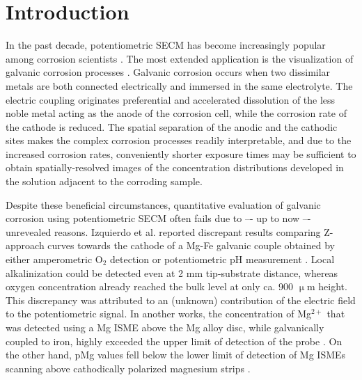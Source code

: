 \documentclass[3p]{elsarticle}
\begin{document}
\section{Introduction}

In the past decade, potentiometric SECM has become increasingly popular among corrosion scientists \cite{lamaka, ZnISME, diamondel, cutedge, H+selective, simulating}.
The most extended application is the visualization of galvanic corrosion processes \cite{amperopot, chloride, spatiozn, fezn}.
Galvanic corrosion occurs when two dissimilar metals are both connected electrically and immersed in the same electrolyte. 
The electric coupling originates preferential and accelerated dissolution of the less noble metal acting as the anode of the corrosion cell, while the corrosion rate of the cathode is reduced.
The spatial separation of the anodic and the cathodic sites makes the complex corrosion processes readily interpretable, and due to the increased corrosion rates, conveniently shorter exposure times may be sufficient to obtain spatially-resolved images of the concentration distributions developed in the solution adjacent to the corroding sample.

Despite these beneficial circumstances, quantitative evaluation of galvanic corrosion using potentiometric SECM often fails due to –- up to now –- unrevealed reasons.
Izquierdo et al. reported discrepant results comparing Z-approach curves towards the cathode of a Mg-Fe galvanic couple obtained by either amperometric O$_2$ detection or potentiometric pH measurement \cite{pH15}. Local alkalinization could be detected even at 2 mm tip-substrate distance, whereas oxygen concentration already reached the bulk level at only ca. 900 $\upmu$m height. This discrepancy was attributed to an (unknown) contribution of the electric field to the potentiometric signal.  
In another works, the concentration of Mg$^{2+}$ that was detected using a Mg ISME above the Mg alloy disc, while galvanically coupled to iron, highly exceeded the upper limit of detection of the probe \cite{overmg1, overmg2, overmg3}.
On the other hand, pMg values fell below the lower limit of detection of Mg ISMEs scanning above cathodically polarized magnesium strips \cite{belowmg}. 
\end{document}
